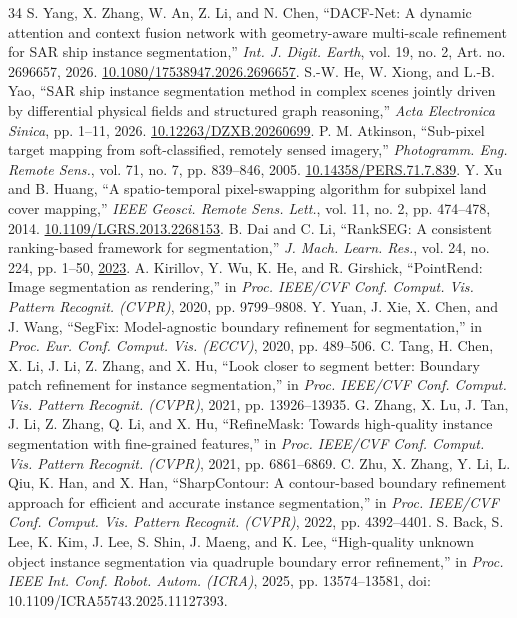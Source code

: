 \documentclass[journal]{IEEEtran}
\begin{document}
\begin{thebibliography}{34}
 S. Yang, X. Zhang, W. An, Z. Li, and N. Chen, ``DACF-Net: A dynamic attention and context fusion network with geometry-aware multi-scale refinement for SAR ship instance segmentation,'' \emph{Int. J. Digit. Earth}, vol. 19, no. 2, Art. no. 2696657, 2026. \href{https://doi.org/10.1080/17538947.2026.2696657}{10.1080/17538947.2026.2696657}.
 S.-W. He, W. Xiong, and L.-B. Yao, ``SAR ship instance segmentation method in complex scenes jointly driven by differential physical fields and structured graph reasoning,'' \emph{Acta Electronica Sinica}, pp. 1--11, 2026. \href{https://doi.org/10.12263/DZXB.20260699}{10.12263/DZXB.20260699}.
 P. M. Atkinson, ``Sub-pixel target mapping from soft-classified, remotely sensed imagery,'' \emph{Photogramm. Eng. Remote Sens.}, vol. 71, no. 7, pp. 839--846, 2005. \href{https://doi.org/10.14358/PERS.71.7.839}{10.14358/PERS.71.7.839}.
 Y. Xu and B. Huang, ``A spatio-temporal pixel-swapping algorithm for subpixel land cover mapping,'' \emph{IEEE Geosci. Remote Sens. Lett.}, vol. 11, no. 2, pp. 474--478, 2014. \href{https://doi.org/10.1109/LGRS.2013.2268153}{10.1109/LGRS.2013.2268153}.
 B. Dai and C. Li, ``RankSEG: A consistent ranking-based framework for segmentation,'' \emph{J. Mach. Learn. Res.}, vol. 24, no. 224, pp. 1--50, \href{https://www.jmlr.org/papers/v24/22-0712.html}{2023}.
 A. Kirillov, Y. Wu, K. He, and R. Girshick, ``PointRend: Image segmentation as rendering,'' in \emph{Proc. IEEE/CVF Conf. Comput. Vis. Pattern Recognit. (CVPR)}, 2020, pp. 9799--9808.
 Y. Yuan, J. Xie, X. Chen, and J. Wang, ``SegFix: Model-agnostic boundary refinement for segmentation,'' in \emph{Proc. Eur. Conf. Comput. Vis. (ECCV)}, 2020, pp. 489--506.
 C. Tang, H. Chen, X. Li, J. Li, Z. Zhang, and X. Hu, ``Look closer to segment better: Boundary patch refinement for instance segmentation,'' in \emph{Proc. IEEE/CVF Conf. Comput. Vis. Pattern Recognit. (CVPR)}, 2021, pp. 13926--13935.
 G. Zhang, X. Lu, J. Tan, J. Li, Z. Zhang, Q. Li, and X. Hu, ``RefineMask: Towards high-quality instance segmentation with fine-grained features,'' in \emph{Proc. IEEE/CVF Conf. Comput. Vis. Pattern Recognit. (CVPR)}, 2021, pp. 6861--6869.
 C. Zhu, X. Zhang, Y. Li, L. Qiu, K. Han, and X. Han, ``SharpContour: A contour-based boundary refinement approach for efficient and accurate instance segmentation,'' in \emph{Proc. IEEE/CVF Conf. Comput. Vis. Pattern Recognit. (CVPR)}, 2022, pp. 4392--4401.
 S. Back, S. Lee, K. Kim, J. Lee, S. Shin, J. Maeng, and K. Lee, ``High-quality unknown object instance segmentation via quadruple boundary error refinement,'' in \emph{Proc. IEEE Int. Conf. Robot. Autom. (ICRA)}, 2025, pp. 13574--13581, doi: 10.1109/ICRA55743.2025.11127393.

\end{thebibliography}
\end{document}
